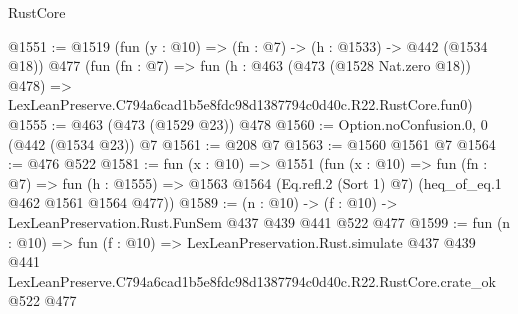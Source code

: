 \begin{lexlean}{RustCore}
\begin{coremodule}
@1551 := @1519
    (fun (y : @10) => (fn : @7) -> (h : @1533) -> @442 (@1534 @18))
    @477
    (fun (fn : @7) =>
    fun (h : @463 (@473 (@1528 Nat.zero @18)) @478) =>
    LexLeanPreserve.C794a6cad1b5e8fdc98d1387794c0d40c.R22.RustCore.fun0)
@1555 := @463 (@473 (@1529 @23)) @478
@1560 := Option.noConfusion.{0, 0} (@442 (@1534 @23)) @7
@1561 := @208 @7
@1563 := @1560 @1561 @7
@1564 := @476 @522
@1581 := fun (x : @10) =>
  @1551
    (fun (x : @10) =>
    fun (fn : @7) =>
    fun (h : @1555) => @1563 @1564 (Eq.refl.{2} (Sort 1) @7) (heq_of_eq.{1} @462 @1561 @1564 @477))
@1589 := (n : @10) -> (f : @10) -> LexLeanPreservation.Rust.FunSem @437 @439 @441 @522 @477
@1599 := fun (n : @10) =>
  fun (f : @10) =>
  LexLeanPreservation.Rust.simulate
    @437
    @439
    @441
    LexLeanPreserve.C794a6cad1b5e8fdc98d1387794c0d40c.R22.RustCore.crate_ok
    @522
    @477
\end{coremodule}
\end{lexlean}
